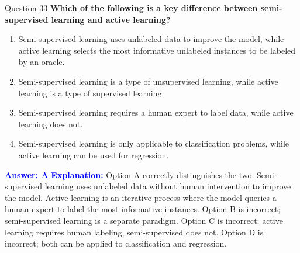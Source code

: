 \documentclass[8pt]{beamer}  %
\begin{document}
	\begin{frame}{Question 33}
		\textbf{Which of the following is a key difference between semi-supervised learning and active learning?}
		\begin{enumerate}
			\item Semi-supervised learning uses unlabeled data to improve the model, while active learning selects the most informative unlabeled instances to be labeled by an oracle.
			\item Semi-supervised learning is a type of unsupervised learning, while active learning is a type of supervised learning.
			\item Semi-supervised learning requires a human expert to label data, while active learning does not.
			\item Semi-supervised learning is only applicable to classification problems, while active learning can be used for regression.
		\end{enumerate}
		\vspace{0.2cm}
		\textcolor{blue}{\textbf{Answer: A}}
		\vspace{0.2cm}
		\textcolor{blue}{\textbf{Explanation:}} Option A correctly distinguishes the two. Semi-supervised learning uses unlabeled data without human intervention to improve the model. Active learning is an iterative process where the model queries a human expert to label the most informative instances. Option B is incorrect; semi-supervised learning is a separate paradigm. Option C is incorrect; active learning requires human labeling, semi-supervised does not. Option D is incorrect; both can be applied to classification and regression.
	\end{frame}
	
\end{document}
